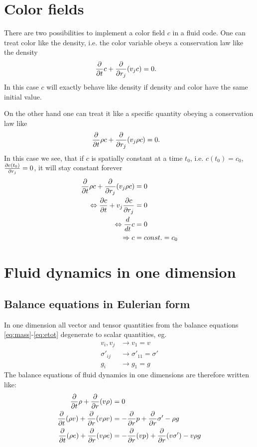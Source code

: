 \section{Color fields}
There are two possibilities to implement a color field $c$ in a fluid code. One
can treat color like the density, i.e. the color variable obeys a conservation
law like the density
\begin{align}
\pd{t} c + \pd{r_j}(v_j c) &= 0.
\end{align}
In this case $c$ will exactly behave like density if density and color have the 
same initial value.

On the other hand one can treat it like a specific quantity obeying a
conservation law like
\begin{align}
\pd{t} \rho c + \pd{r_j}(v_j \rho c) &= 0.
\end{align}
In this case we see, that if $c$ is spatially constant at a time $t_0$, i.e. 
$c(t_0)=c_0$, $\ppd{r_j}{c(t_0)}=0$, it will stay constant forever
\begin{align}
\pd{t} \rho c + \pd{r_j}(v_j \rho c) &= 0 \\
\Leftrightarrow \ppd{t}{c} + v_j \ppd{r_j}{c} &= 0 \\
\Leftrightarrow \td{t} c &=0\\
\Rightarrow c &= const. = c_0
\end{align}

\section{Fluid dynamics in one dimension}
\subsection{Balance equations in Eulerian form}
In one dimension all vector and tensor quantities from the balance equations
\eqref{eq:mass}-\eqref{eq:etot} degenerate to scalar quantities, eg.
\begin{align}
v_i,v_j &\longrightarrow v_1=v\\
\sigma'_{ij} &\longrightarrow \sigma'_{11}=\sigma'\\
g_i &\longrightarrow g_1=g
\end{align}
The balance equations of fluid dynamics in one dimensions are therefore written
like:
\begin{align}
\pd{t}\rho + \pd{r}(v \rho) &= 0 \label{eq:1dmass}\\
\pd{t}(\rho v) + \pd{r}(v \rho v) &= -\pd{r}p + \pd{r}\sigma' -\rho g
\label{eq:1dmom} \\
\pd{t}(\rho e) + \pd{r}(v \rho e) &= -\pd{r}(v p) + \pd{r}(v \sigma') - v \rho g
\label{eq:1detot}
\end{align}
